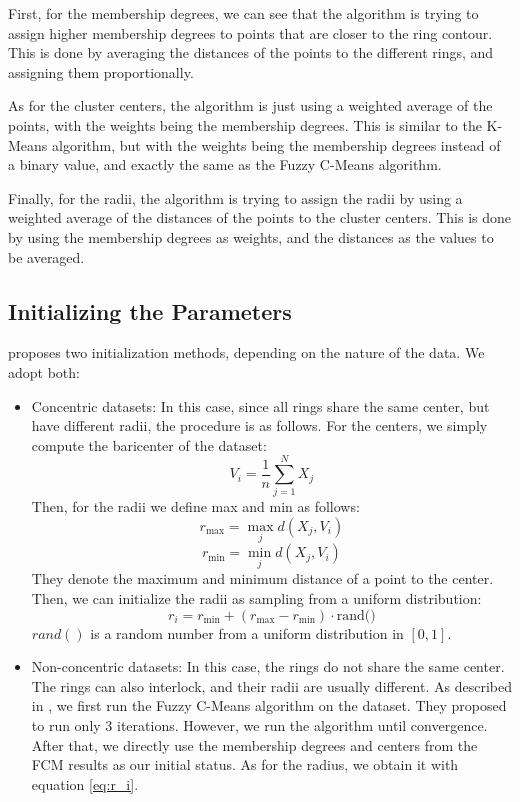 \documentclass[conference]{IEEEtran}
\begin{document}
First, for the membership degrees, we can see that the algorithm is trying to assign higher membership degrees to points that are closer to the ring contour.
This is done by averaging the distances of the points to the different rings, and assigning them proportionally.

As for the cluster centers, the algorithm is just using a weighted average of the points, with the weights being the membership degrees.
This is similar to the K-Means algorithm, but with the weights being the membership degrees instead of a binary value, and exactly the same as the Fuzzy C-Means algorithm.

Finally, for the radii, the algorithm is trying to assign the radii by using a weighted average of the distances of the points to the cluster centers.
This is done by using the membership degrees as weights, and the distances as the values to be averaged.


\subsection{Initializing the Parameters}
\cite{308484} proposes two initialization methods, depending on the nature of the data. We adopt both:
\begin{itemize}
    \item Concentric datasets: In this case, since all rings share the same center, but have different radii, the procedure is as follows.
    For the centers, we simply compute the baricenter of the dataset:
    \begin{equation}
        V_i = \frac{1}{n} \sum_{j=1}^{N} X_j
    \end{equation}
    Then, for the radii we define max and min as follows:
    \begin{equation}
        r_{\text{max}} = \max_{j} d(X_j, V_i)
    \end{equation}
    \begin{equation}
        r_{\text{min}} = \min_{j} d(X_j, V_i)
    \end{equation}
    They denote the maximum and minimum distance of a point to the center. Then, we can initialize the radii as sampling from a uniform distribution:
    \begin{equation}
        r_i = r_{\text{min}} + (r_{\text{max}} - r_{\text{min}}) \cdot \text{rand()}
    \end{equation}
    $rand()$ is a random number from a uniform distribution in $[0, 1]$.
    \item Non-concentric datasets: In this case, the rings do not share the same center. The rings can also interlock, and their radii are usually different.
    As described in \cite{308484}, we first run the Fuzzy C-Means algorithm on the dataset. They proposed to run only 3 iterations. However, we run the algorithm until convergence.
    After that, we directly use the membership degrees and centers from the FCM results as our initial status. As for the radius, we obtain it with equation \eqref{eq:r_i}.
\end{itemize}
\end{document}
